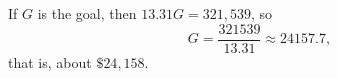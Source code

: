 If $G$ is the goal, then $13.31G=321{,}539$, so
\[G=\dfrac{321539}{13.31}\approx 24157.7,\]
that is, about $\boxed{\$24{,}158}$.
